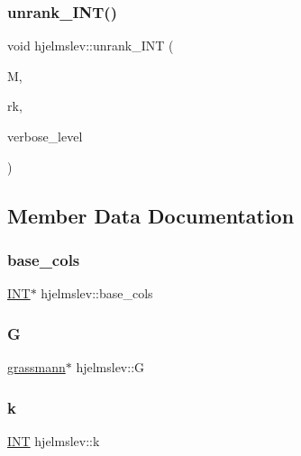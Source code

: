 \subsubsection{\texorpdfstring{unrank\+\_\+\+I\+N\+T()}{unrank\_INT()}}
{\footnotesize\ttfamily void hjelmslev\+::unrank\+\_\+\+I\+NT (\begin{DoxyParamCaption}\item[{\mbox{\hyperlink{galois_8h_a09fddde158a3a20bd2dcadb609de11dc}{I\+NT}} $\ast$}]{M,  }\item[{\mbox{\hyperlink{galois_8h_a09fddde158a3a20bd2dcadb609de11dc}{I\+NT}}}]{rk,  }\item[{\mbox{\hyperlink{galois_8h_a09fddde158a3a20bd2dcadb609de11dc}{I\+NT}}}]{verbose\+\_\+level }\end{DoxyParamCaption})}



\subsection{Member Data Documentation}
\mbox{\label{classhjelmslev_a16e9e6eaa2888da760de7e27cb2afb19}} 
\subsubsection{\texorpdfstring{base\+\_\+cols}{base\_cols}}
{\footnotesize\ttfamily \mbox{\hyperlink{galois_8h_a09fddde158a3a20bd2dcadb609de11dc}{I\+NT}}$\ast$ hjelmslev\+::base\+\_\+cols}

\mbox{\label{classhjelmslev_af80aa3b9712664949795afb2fca4397a}} 
\subsubsection{\texorpdfstring{G}{G}}
{\footnotesize\ttfamily \mbox{\hyperlink{classgrassmann}{grassmann}}$\ast$ hjelmslev\+::G}

\mbox{\label{classhjelmslev_a1f59d920302f641dcd25451755c917fb}} 
\subsubsection{\texorpdfstring{k}{k}}
{\footnotesize\ttfamily \mbox{\hyperlink{galois_8h_a09fddde158a3a20bd2dcadb609de11dc}{I\+NT}} hjelmslev\+::k}

